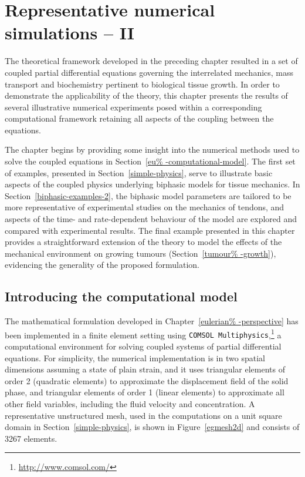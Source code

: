 \chapter{Representative numerical simulations -- II}
\label{numerical-simulations-2}

The theoretical framework developed in the preceding chapter resulted
in a set of coupled partial differential equations governing the
interrelated mechanics, mass transport and biochemistry pertinent to
biological tissue growth. In order to demonstrate the applicability of
the theory, this chapter presents the results of several illustrative
numerical experiments posed within a corresponding computational
framework retaining all aspects of the coupling between the equations.

The chapter begins by providing some insight into the numerical
methods used to solve the coupled equations in Section~\ref{eu%
  -computational-model}. The first set of examples, presented in
Section~\ref{simple-physics}, serve to illustrate basic aspects of the
coupled physics underlying biphasic models for tissue mechanics. In
Section~\ref{biphasic-examples-2}, the biphasic model parameters are
tailored to be more representative of experimental studies on the
mechanics of tendons, and aspects of the time- and rate-dependent
behaviour of the model are explored and compared with experimental
results. The final example presented in this chapter provides a
straightforward extension of the theory to model the effects of the
mechanical environment on growing tumours (Section~\ref{tumour%
  -growth}), evidencing the generality of the proposed formulation.

\section{Introducing the computational model}
\label{eu-computational-model}

The mathematical formulation developed in Chapter~\ref{eulerian%
  -perspective} has been implemented in a finite element setting using
{\tt COMSOL Multiphysics},\footnote{\href {http://www.comsol.com/}
  {http://www.comsol.com/}} a computational environment for solving
coupled systems of partial differential equations. For simplicity, the
numerical implementation is in two spatial dimensions assuming a state
of plain strain, and it uses triangular elements of order 2 (quadratic
elements) to approximate the displacement field of the solid phase,
and triangular elements of order 1 (linear elements) to approximate
all other field variables, including the fluid velocity and
concentration. A representative unstructured mesh, used in the
computations on a unit square domain in Section~\ref{simple-physics},
is shown in Figure~\ref{egmesh2d} and consists of 3267 elements.

